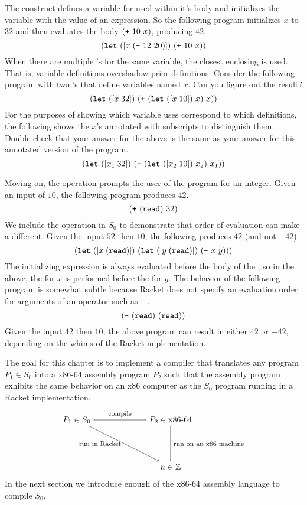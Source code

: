 \documentclass[12pt]{book}
\begin{document}
The  construct defines a variable for used within it's body
and initializes the variable with the value of an expression.  So the
following program initializes $x$ to $32$ and then evaluates the body
$(\texttt{+}~10~x)$, producing $42$.
\[
(\texttt{let}~([x\; (\texttt{+}~12~20) ])~ (\texttt{+}~10~x) ) 
\]
When there are multiple 's for the same variable, the closest
enclosing  is used. That is, variable definitions overshadow
prior definitions. Consider the following program with two 's
that define variables named $x$. Can you figure out the result?
\[
(\texttt{let}~([x\;32])~ (\texttt{+}~ (\texttt{let}~([x\;10])~x) ~ x ) )
\]
For the purposes of showing which variable uses correspond to which
definitions, the following shows the $x$'s annotated with subscripts
to distinguish them. Double check that your answer for the above is
the same as your answer for this annotated version of the program.
\[
(\texttt{let}~([x_1\;32])~ (\texttt{+}~ (\texttt{let}~([x_2\;10])~x_2) ~ x_1 ) )
\]

Moving on, the  operation prompts the user of the program
for an integer. Given an input of $10$, the following program produces
$42$.
\[
(\texttt{+}~(\texttt{read})~32)
\]
We include the  operation in $S_0$ to demonstrate that order
of evaluation can make a different. Given the input $52$ then $10$,
the following produces $42$ (and not $-42$).
\[
(\texttt{let}~([x\;(\texttt{read})])~ (\texttt{let}~([y\;(\texttt{read})])~ (\texttt{-}~x~y) ) )
\]
The initializing expression is always evaluated before the body of the
, so in the above, the  for $x$ is performed before
the  for $y$.
%
The behavior of the following program is somewhat subtle because
Racket does not specify an evaluation order for arguments of an
operator such as $-$.
\[
(\texttt{-}~(\texttt{read})~(\texttt{read}))
\]
Given the input $42$ then $10$, the above program can result in either
$42$ or $-42$, depending on the whims of the Racket implementation.

The goal for this chapter is to implement a compiler that translates
any program $P_1 \in S_0$ into a x86-64 assembly program $P_2$ such
that the assembly program exhibits the same behavior on an x86
computer as the $S_0$ program running in a Racket implementation.
\[
\begin{tikzpicture}[baseline=(current  bounding  box.center)]
 \node (p1) at (0,  0)   {$P_1 \in S_0$};
 \node (p2) at (4,  0)   {$P_2 \in \text{x86-64}$};
 \node (o)  at (4, -2) {$n \in \mathbb{Z}$};

 \path[->] (p1) edge [above] node {\footnotesize compile} (p2);
 \path[->] (p1) edge [left]  node {\footnotesize run in Racket} (o);
 \path[->] (p2) edge [right] node {\footnotesize run on an x86 machine} (o);
\end{tikzpicture}
\]
In the next section we introduce enough of the x86-64 assembly
language to compile $S_0$.
\end{document}
